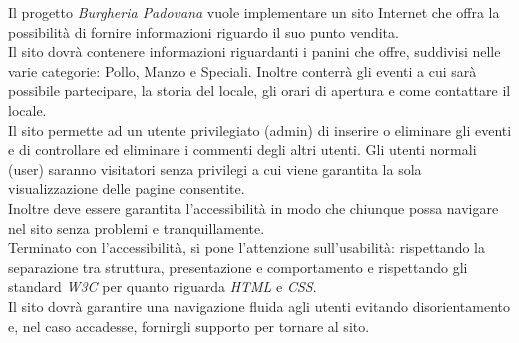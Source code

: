 Il progetto \emph{Burgheria Padovana} vuole implementare un sito Internet che offra la possibilità di fornire informazioni riguardo il suo punto vendita.\\
Il sito dovrà contenere informazioni riguardanti i panini che offre, suddivisi nelle varie categorie: Pollo, Manzo e Speciali. Inoltre conterrà gli eventi a cui sarà possibile partecipare, la storia del locale, gli orari di apertura e come contattare il locale.\\
Il sito permette ad un utente privilegiato (admin) di inserire o eliminare gli eventi e di controllare ed eliminare i commenti degli altri utenti. Gli utenti normali (user) saranno visitatori 
senza privilegi a cui viene garantita la sola visualizzazione delle pagine consentite.\\
Inoltre deve essere garantita l'accessibilità in modo che chiunque possa navigare nel sito senza problemi e tranquillamente.\\
Terminato con l'accessibilità, si pone l'attenzione sull'usabilità: rispettando la separazione tra struttura, presentazione e comportamento e rispettando gli standard \emph{W3C} per quanto riguarda \emph{HTML} e \emph{CSS}.\\
Il sito dovrà garantire una navigazione fluida agli utenti evitando disorientamento e, nel caso accadesse, fornirgli supporto per tornare al sito.\\